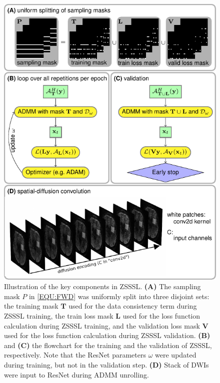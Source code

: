 \documentclass[journal,twoside,web]{ieeecolor}
\begin{document}
    \begin{figure}
    	\centering
    	\includegraphics[width=\columnwidth]{../figures/fig1.pdf}
    	\caption{Illustration of the key components in ZSSSL. 
    		\textbf{(A)} The sampling mask $P$ in \cref{EQU:FWD} was 
    		uniformly split into three disjoint sets: 
    		the training mask $\mathbf{T}$ used for 
    		the data consistency term during ZSSSL training, 
    		the train loss mask $\mathbf{L}$ used for
    		the loss function calculation during ZSSSL training, and 
    		the validation loss mask $\mathbf{V}$ used for 
    		the loss function calculation during ZSSSL validation.
    		\textbf{(B)} and \textbf{(C)} the flowchart 
    		for the training and the validation of ZSSSL, respectively.
    		Note that the ResNet parameters $\omega$ were updated during training, 
    		but not in the validation step.
    		\textbf{(D)} Stack of DWIs were input to ResNet during ADMM unrolling.}
    	\label{FIG:ZSSSL}
    \end{figure}
\end{document}
